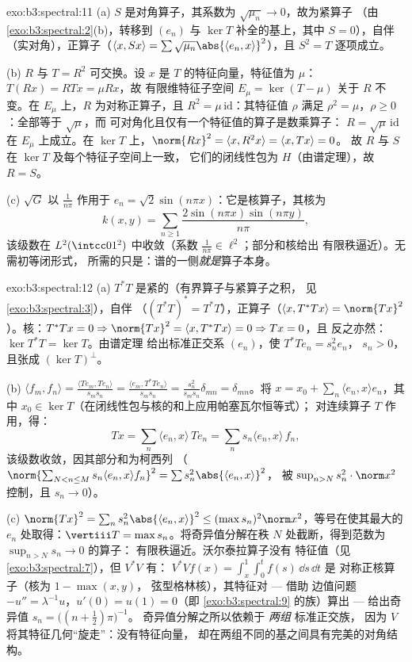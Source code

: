 \begin{solution}{exo:b3:spectral:11}
(a) $S$ 是对角算子，其系数为
$\sqrt{\mu_n} \to 0$，故为紧算子
（由\cref{exo:b3:spectral:2}(b)，转移到
$(e_n)$ 与 $\ker T$ 补全的基上，其中 $S = 0$），自伴
（实对角），正算子（$\langle x, Sx\rangle =
\sum\sqrt{\mu_n}\abs{\langle e_n, x\rangle}^2$），且 $S^2 =
T$ 逐项成立。

(b) $R$ 与 $T = R^2$ 可交换。设 $x$ 是
$T$ 的特征向量，特征值为 $\mu$：$T(Rx) = RTx = \mu Rx$，故
有限维特征子空间 $E_\mu = \ker(T - \mu)$ 关于
$R$ 不变。在 $E_\mu$ 上，$R$ 为对称正算子，且 $R^2
= \mu\,\mathrm{id}$：其特征值 $\rho$ 满足 $\rho^2
= \mu$，$\rho \geq 0$：全部等于 $\sqrt\mu$，而
可对角化且仅有一个特征值的算子是数乘算子：
$R = \sqrt\mu\,\mathrm{id}$ 在 $E_\mu$ 上成立。在 $\ker T$ 上，$\norm
{Rx}^2 = \langle x, R^2x\rangle = \langle x, Tx\rangle = 0$。
故 $R$ 与 $S$ 在 $\ker T$ 及每个特征子空间上一致，
它们的闭线性包为 $H$（由谱定理），故 $R = S$。

(c) $\sqrt G$ 以 $\frac1{n\pi}$ 作用于 $e_n =
\sqrt2\sin(n\pi x)$：它是核算子，其核为
\[
k(x, y) = \sum_{n\geq1}\frac{2\sin(n\pi x)\sin(n\pi
y)}{n\pi},
\]
该级数在 $L^2(\intcc01^2)$ 中收敛（系数
$\frac1{n\pi} \in \ell^2$；部分和核给出
有限秩逼近）。无需初等闭形式，
所需的只是：谱的一侧\emph{就是}算子本身。
\end{solution}

\begin{solution}{exo:b3:spectral:12}
(a) $T^*T$ 是紧的（有界算子与紧算子之积，
见\cref{exo:b3:spectral:3}），自伴
（$(T^*T)^* = T^*T$），正算子（$\langle x, T^*Tx\rangle =
\norm{Tx}^2$）。核：$T^*Tx = 0 \Rightarrow \norm{Tx}^2 =
\langle x, T^*Tx\rangle = 0 \Rightarrow Tx = 0$，且
反之亦然：$\ker T^*T = \ker T$。由谱定理
给出标准正交系 $(e_n)$，使 $T^*Te_n = s_n^2e_n$，
$s_n > 0$，且张成 $(\ker T)^\perp$。

(b) $\langle f_m, f_n\rangle = \frac{\langle Te_m,
Te_n\rangle}{s_ms_n} = \frac{\langle e_m,
T^*Te_n\rangle}{s_ms_n} = \frac{s_n^2}{s_ms_n}\delta_{mn} =
\delta_{mn}$。将 $x = x_0 + \sum_n\langle e_n, x\rangle
e_n$，其中 $x_0 \in \ker T$（在闭线性包与核的和上应用帕塞瓦尔恒等式）；
对连续算子 $T$ 作用，得：
\[
Tx = \sum_n\langle e_n, x\rangle\,Te_n =
\sum_ns_n\langle e_n, x\rangle\,f_n,
\]
该级数收敛，因其部分和为柯西列
（$\norm{\sum_{N<n\leq M}s_n\langle e_n, x\rangle f_n}^2 =
\sum s_n^2\abs{\langle e_n, x\rangle}^2$，
被 $\sup_{n>N}s_n^2\cdot\norm x^2$ 控制，且 $s_n \to 0$）。

(c) $\norm{Tx}^2 = \sum_ns_n^2\abs{\langle e_n, x\rangle}^2
\leq (\max s_n)^2\norm x^2$，等号在使其最大的
$e_n$ 处取得：$\vertiii T = \max s_n$。将奇异值分解在秩
$N$ 处截断，得到范数为 $\sup_{n>N}s_n \to 0$ 的算子：
有限秩逼近。沃尔泰拉算子没有
特征值（见\cref{exo:b3:spectral:7}），但 $V^*V$ 有：
$V^*Vf(x) = \int_x^1\int_0^tf(s)\,\dd s\,\dd t$ 是
对称正核算子（核为 $1 - \max(x,y)$，
弦型格林核），其特征对 --- 借助
边值问题 $-u'' = \lambda^{-1}u$，$u'(0)
= u(1) = 0$（即 \cref{exo:b3:spectral:9} 的族）算出 ---
给出奇异值 $s_n = \bigl((n + \frac12)\pi\bigr)^{-1}$。
奇异值分解之所以依赖于 \emph{两组} 标准正交族，
因为 $V$ 将其特征几何“旋走”：没有特征向量，
却在两组不同的基之间具有完美的对角结构。
\end{solution}

